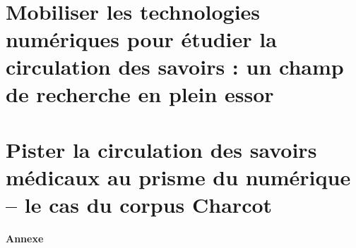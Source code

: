 \documentclass[a4paper,12pt]{book}
\begin{document}
\renewcommand{\arraystretch}{1.5}


~
\thispagestyle{empty}
\setcounter{page}{0}
\newpage










\part{Mobiliser les technologies numériques pour étudier la circulation des savoirs : un champ de recherche en plein essor}






\part{Pister la circulation des savoirs médicaux au prisme du numérique -- le cas du corpus Charcot}








\appendix
\let\cleardoublepage\clearpage %

\clearpage
\thispagestyle{empty}
\begin{center}
	\vspace*{\fill} %
	{\LARGE\bfseries Annexe}
	\vspace*{\fill} %
\end{center}


\clearpage %


\cleardoublepage
{}


\end{document}
